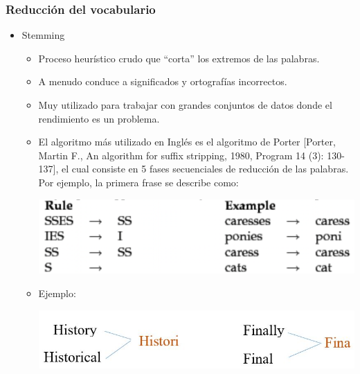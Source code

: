 \documentclass[
10pt, %
aspectratio=169, %
]{beamer}
\begin{document}
	\begin{frame}
		
		\frametitle{Reducción del vocabulario}
		
		\begin{itemize}
			\item Stemming
			
			\begin{itemize}
				\item Proceso heurístico crudo que ``corta'' los extremos de las palabras.
				
				\item A menudo conduce a significados y ortografías incorrectos.
				
				\item Muy utilizado para trabajar con grandes conjuntos de datos donde el rendimiento es un problema.
				
				\item El algoritmo más utilizado en Inglés es el algoritmo de Porter [Porter, Martin F., An algorithm for suffix stripping, 1980, Program 14 (3): 130-137], el cual consiste en 5 fases secuenciales de reducción de las palabras. Por ejemplo, la primera frase se describe como: 
				
				\begin{centering}
					\includegraphics[scale=0.25]{porter.png}
				\end{centering}
				
				\pause
				\item Ejemplo:
				
				\begin{centering}
					\includegraphics[scale=0.7]{stemming.jpg}
				\end{centering}
				
			\end{itemize}
			
		\end{itemize}
		
	\end{frame}
	
\end{document}

